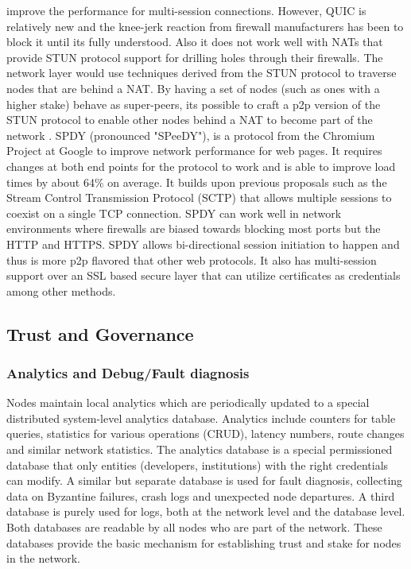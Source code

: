 improve the performance for multi-session connections. However, QUIC is relatively new and the knee-jerk reaction from
firewall manufacturers has been to block it until its fully understood. Also it does not work well with NATs that
provide STUN protocol \cite{stun_protocol} support for drilling holes through their firewalls.  The network layer would use techniques derived from the STUN protocol to traverse nodes
that are behind a NAT. By having a set of nodes (such as ones with a higher stake) behave as
super-peers, its possible to craft a p2p version of the STUN protocol to enable
other nodes behind a NAT to become part of the network \cite{p2p_nat}.
\newline\newline
SPDY (pronounced "SPeeDY"), is a protocol from the Chromium Project at Google \cite{speedy_protocol} to improve network performance for web
pages. It requires changes at both end points for the protocol to work and is able to improve load times by about 64\%
on average. It builds upon previous proposals such as the Stream Control Transmission Protocol (SCTP)
\cite{sctp_rfc} that allows multiple sessions to coexist on a single TCP connection. SPDY can work well in network
environments where firewalls are biased towards blocking most ports but the HTTP and HTTPS. SPDY allows bi-directional
session initiation to happen and thus is more p2p flavored that other web protocols. It also has multi-session support
over an SSL based secure layer that can utilize certificates as credentials among other methods.


\subsection{Trust and Governance}
\label{net:gov}

\subsubsection{Analytics and Debug/Fault diagnosis}
Nodes maintain local analytics which are periodically updated to a special distributed system-level analytics
database. Analytics include counters for table queries, statistics for various operations (CRUD), latency numbers, route
changes and similar network statistics. The analytics database is a special permissioned database that only entities
(developers, institutions) with the right credentials can modify. A similar but separate database is used for fault diagnosis, collecting data on Byzantine failures, crash logs and
unexpected node departures. A third database is purely used for logs, both at the network level and the database level. Both databases are readable by all nodes who are part of the network. These databases provide the basic mechanism for
establishing trust and stake for nodes in the network.

